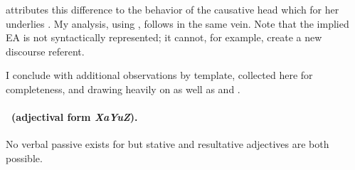 \begin{exe}
\begin{xlist}
\begin{exe}
\begin{xlist}
\begin{exe}
\begin{exe}
\begin{xlist}
\begin{exe}
\begin{exe}
\begin{xlist}
\begin{exe}
\begin{xlist}
\begin{exe}
\begin{xlist}
\begin{exe}
\begin{xlist}
\begin{exe}
\begin{xlist}
\begin{xlist}
\begin{exe}
\begin{xlist}
\begin{exe}
\begin{xlist}
\begin{exe}
\begin{exe}
\begin{exe}
\begin{xlist}
\begin{exe}
\begin{exe}
\begin{xlist}
\begin{exe}
\begin{xlist}
\begin{exe}
\begin{xlist}
\begin{exe}
\begin{xlist}
\begin{xlist}
\begin{exe}
\begin{xlist}
\begin{exe}
\begin{xlist}
\begin{exe}
\begin{xlist}
\begin{exe}
\begin{xlist}
\begin{exe}
\begin{exe}
\begin{exe}
\begin{exe}
\begin{exe}
\begin{xlist}
\begin{xlist}
\begin{exe}
\begin{xlist}
\begin{exe}
\begin{xlist}
\cite{doron14adj} attributes this difference to the behavior of the causative head  which for her underlies {\thif}. My analysis, using {\vd}, follows in the same vein. Note that the implied EA is not syntactically represented; it cannot, for example, create a new discourse referent.
 \begin{exe}
 \z 

I conclude with additional observations by template, collected here for completeness, and drawing heavily on \cite{doron00} as well as \cite{doron14adj} and \cite{meltzerasscher11}.

\paragraph*{\tkal~(adjectival form \emph{XaYuZ}).} No verbal passive exists for {\tkal} but stative and resultative adjectives are both possible.


\end{exe}
\end{xlist}
\end{exe}
\end{xlist}
\end{exe}
\end{xlist}
\end{xlist}
\end{exe}
\end{exe}
\end{exe}
\end{exe}
\end{exe}
\end{xlist}
\end{exe}
\end{xlist}
\end{exe}
\end{xlist}
\end{exe}
\end{xlist}
\end{exe}
\end{xlist}
\end{xlist}
\end{exe}
\end{xlist}
\end{exe}
\end{xlist}
\end{exe}
\end{xlist}
\end{exe}
\end{exe}
\end{xlist}
\end{exe}
\end{exe}
\end{exe}
\end{xlist}
\end{exe}
\end{xlist}
\end{exe}
\end{xlist}
\end{xlist}
\end{exe}
\end{xlist}
\end{exe}
\end{xlist}
\end{exe}
\end{xlist}
\end{exe}
\end{xlist}
\end{exe}
\end{exe}
\end{xlist}
\end{exe}
\end{exe}
\end{xlist}
\end{exe}
\end{xlist}
\end{exe}
